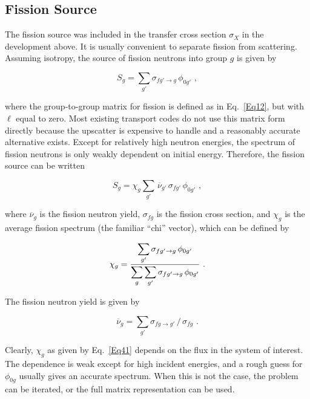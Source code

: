 \subsection{Fission Source}
\label{ssGROUPR_FissSource}

The fission source was included in the
transfer cross section $\sigma_X$ in the development above.  It is
usually convenient to separate fission from scattering.  Assuming
isotropy, the source of fission neutrons into group $g$ is given by

  \begin{equation}
    S_g=\sum_{g'}\sigma_{fg'\rightarrow g}\,\phi_{0g'}\,\,,
  \end{equation}

\noindent
where the group-to-group matrix
for fission is defined as in Eq.~\ref{Eq12}, but with $\ell$ equal
to zero.  Most existing transport codes do not use this matrix
form directly because the upscatter is expensive to handle and
a reasonably accurate alternative exists.  Except for relatively
high neutron energies, the spectrum of fission neutrons is only
weakly dependent on initial energy.  Therefore, the fission source
can be written

  \begin{equation}
    S_g=\chi_g\sum_{g'}\,\overline\nu_{g'}\,\sigma_{fg'}\,\phi_{0g'}\,\,,
  \end{equation}

\noindent
where $\overline\nu_g$ is the fission neutron yield, $\sigma_{fg}$ is the
fission cross section, and $\chi_g$ is the average fission spectrum
(the familiar ``chi'' vector), which can be defined by

  \begin{equation}
    \chi_g={\displaystyle{\sum_{g'}\sigma_{fg'\rightarrow g}\,\phi_{0g'}}
    \over\displaystyle{\sum_{g}\sum_{g'}\sigma_{fg'\rightarrow g}
    \,\phi_{0g'}}}\,\,.
  \label{Eq41}
  \end{equation}

\noindent
The fission neutron yield is given by

  \begin{equation}
    \overline\nu_{g}
    = \sum_{g'}\sigma_{fg\rightarrow g'}\,/\,\sigma_{fg}\,\,.
  \end{equation}

\noindent
Clearly, $\chi_g$ as given by Eq.~\ref{Eq41} depends on the flux in the
system of interest.  The dependence is weak except for high incident
energies, and a rough guess for $\phi_{0g}$ usually gives an accurate
spectrum.  When this is not the case, the problem can be iterated, or
the full matrix representation can be used.

